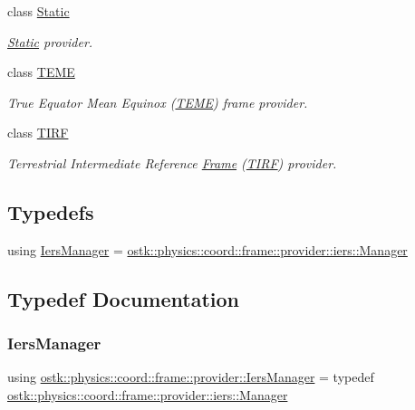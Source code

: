 \begin{DoxyCompactItemize}
class \hyperlink{classostk_1_1physics_1_1coord_1_1frame_1_1provider_1_1_static}{Static}
\begin{DoxyCompactList}\small\item\em \hyperlink{classostk_1_1physics_1_1coord_1_1frame_1_1provider_1_1_static}{Static} provider. \end{DoxyCompactList}\item 
class \hyperlink{classostk_1_1physics_1_1coord_1_1frame_1_1provider_1_1_t_e_m_e}{T\+E\+ME}
\begin{DoxyCompactList}\small\item\em True Equator Mean Equinox (\hyperlink{classostk_1_1physics_1_1coord_1_1frame_1_1provider_1_1_t_e_m_e}{T\+E\+ME}) frame provider. \end{DoxyCompactList}\item 
class \hyperlink{classostk_1_1physics_1_1coord_1_1frame_1_1provider_1_1_t_i_r_f}{T\+I\+RF}
\begin{DoxyCompactList}\small\item\em Terrestrial Intermediate Reference \hyperlink{classostk_1_1physics_1_1coord_1_1_frame}{Frame} (\hyperlink{classostk_1_1physics_1_1coord_1_1frame_1_1provider_1_1_t_i_r_f}{T\+I\+RF}) provider. \end{DoxyCompactList}\end{DoxyCompactItemize}
\subsection*{Typedefs}
\begin{DoxyCompactItemize}
\item 
using \hyperlink{namespaceostk_1_1physics_1_1coord_1_1frame_1_1provider_a12fe12ec00381f0f866c1cb25df6b88f}{Iers\+Manager} = \hyperlink{classostk_1_1physics_1_1coord_1_1frame_1_1provider_1_1iers_1_1_manager}{ostk\+::physics\+::coord\+::frame\+::provider\+::iers\+::\+Manager}
\end{DoxyCompactItemize}


\subsection{Typedef Documentation}
\mbox{\label{namespaceostk_1_1physics_1_1coord_1_1frame_1_1provider_a12fe12ec00381f0f866c1cb25df6b88f}} 
\subsubsection{\texorpdfstring{Iers\+Manager}{IersManager}}
{\footnotesize\ttfamily using \hyperlink{namespaceostk_1_1physics_1_1coord_1_1frame_1_1provider_a12fe12ec00381f0f866c1cb25df6b88f}{ostk\+::physics\+::coord\+::frame\+::provider\+::\+Iers\+Manager} = typedef \hyperlink{classostk_1_1physics_1_1coord_1_1frame_1_1provider_1_1iers_1_1_manager}{ostk\+::physics\+::coord\+::frame\+::provider\+::iers\+::\+Manager}}

